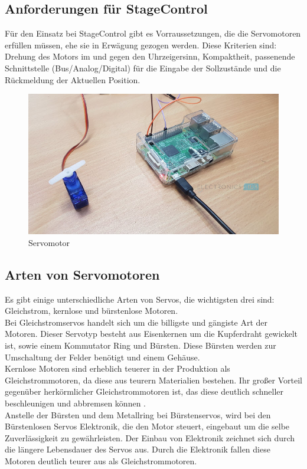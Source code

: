 \subsection{Anforderungen für StageControl}
Für den Einsatz bei StageControl gibt es Vorraussetzungen, die die Servomotoren erfüllen müssen, ehe sie in Erwägung gezogen werden. Diese Kriterien sind: Drehung des Motors im und gegen den Uhrzeigersinn, Kompaktheit, passenende Schnittstelle (Bus/Analog/Digital) für die Eingabe der Sollzustände und die Rückmeldung der Aktuellen Position.

\begin{figure}[H]
	\centering
	\includegraphics[width=0.7\linewidth]{images/servo.jpg}
	\caption[Servomotor]{Servomotor}
	\label{fig:Servo}
\end{figure}

\subsection{Arten von Servomotoren}
Es gibt einige unterschiedliche Arten von Servos, die wichtigsten drei sind: Gleichstrom, kernlose und bürstenlose Motoren. \\
Bei Gleichstromservos handelt sich um die billigste und gängiste Art der Motoren. Dieser Servotyp besteht aus Eisenkernen um die Kupferdraht gewickelt ist, sowie einem Kommutator Ring und Bürsten. Diese Bürsten werden zur Umschaltung der Felder benötigt und einem Gehäuse. \\
Kernlose Motoren sind erheblich teuerer in der Produktion als Gleichstrommotoren, da diese aus teurern Materialien bestehen. Ihr großer Vorteil gegenüber herkörmlicher Gleichstrommotoren ist, das diese deutlich schneller beschleunigen und abbremsen können \textcite{ServomotorArten}. \\
Anstelle der Bürsten und dem Metallring bei Bürstenservos, wird bei den Bürstenlosen Servos Elektronik, die den Motor steuert, eingebaut um die selbe Zuverlässigkeit zu gewährleisten. Der Einbau von Elektronik zeichnet sich durch die längere Lebensdauer des Servos aus. Durch die Elektronik fallen diese Motoren deutlich teurer aus als Gleichstrommotoren. \\




